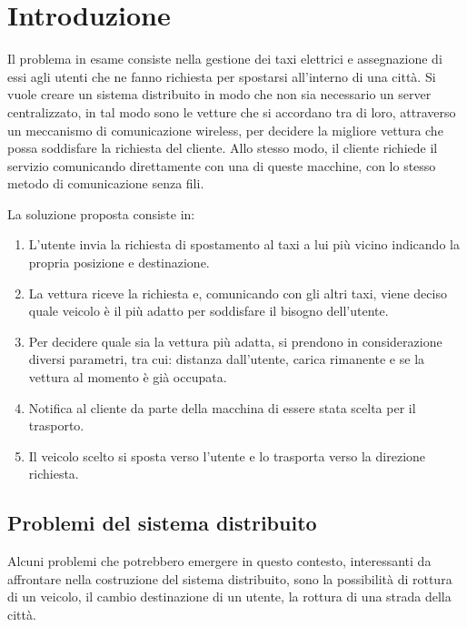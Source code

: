 
\chapter{Introduzione}

Il problema in esame consiste nella gestione dei taxi elettrici e assegnazione di essi agli utenti che ne fanno richiesta per spostarsi all'interno di una città. Si vuole creare un sistema distribuito in modo che non sia necessario un server centralizzato, in tal modo sono le vetture che si accordano tra di loro, attraverso un meccanismo di comunicazione wireless, per decidere la migliore vettura che possa soddisfare la richiesta del cliente. Allo stesso modo, il cliente richiede il servizio comunicando direttamente con una di queste macchine, con lo stesso metodo di comunicazione senza fili. 

La soluzione proposta consiste in:
\begin{enumerate}
	\item L'utente invia la richiesta di spostamento al taxi a lui più vicino indicando la propria posizione e destinazione.
	\item La vettura riceve la richiesta e, comunicando con gli altri taxi, viene deciso quale veicolo è il più adatto per soddisfare il bisogno dell'utente.
	\item Per decidere quale sia la vettura più adatta, si prendono in considerazione diversi parametri, tra cui: distanza dall'utente, carica rimanente e se la vettura al momento è già occupata.
	\item Notifica al cliente da parte della macchina di essere stata scelta per il trasporto.
	\item Il veicolo scelto si sposta verso l'utente e lo trasporta verso la direzione richiesta.
\end{enumerate}

\section{Problemi del sistema distribuito} \label{problematiche_distribuite}

Alcuni problemi che potrebbero emergere in questo contesto, interessanti da affrontare nella costruzione del sistema distribuito, sono la possibilità di rottura di un veicolo, il cambio destinazione di un utente, la rottura di una strada della città.

